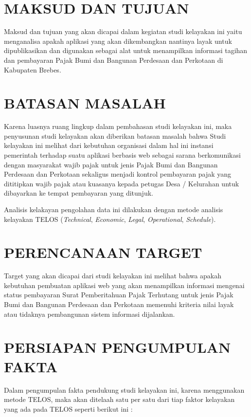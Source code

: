 \documentclass[pdftex,12pt, oneside]{article}
\begin{document}
\section{MAKSUD DAN TUJUAN}

Maksud dan tujuan yang akan dicapai dalam kegiatan studi kelayakan ini yaitu menganalisa apakah aplikasi yang akan dikembangkan nantinya layak untuk dipublikasikan dan digunakan sebagai alat untuk menampilkan informasi tagihan dan pembayaran Pajak Bumi dan Bangunan Perdesaan dan Perkotaan di Kabupaten Brebes.

\section{BATASAN MASALAH}

Karena luasnya ruang lingkup dalam pembahasan studi kelayakan ini, maka penyusunan studi kelayakan akan diberikan batasan masalah bahwa Studi kelayakan ini melihat dari kebutuhan organisasi dalam hal ini instansi pemerintah terhadap suatu aplikasi berbasis web sebagai sarana berkomunikasi dengan masyarakat wajib pajak untuk jenis Pajak Bumi dan Bangunan Perdesaan dan Perkotaan sekaligus menjadi kontrol pembayaran pajak yang dititipkan wajib pajak atau kuasanya kepada petugas Desa / Kelurahan untuk dibayarkan ke tempat pembayaran yang ditunjuk.

Analisis kelakayan pengolahan data ini dilakukan dengan metode analisis kelayakan TELOS (\textit{Technical}, \textit{Economic}, \textit{Legal}, \textit{Operational}, \textit{Schedule}).
  
\section{PERENCANAAN TARGET}

Target yang akan dicapai dari studi kelayakan ini melihat bahwa apakah kebutuhan pembuatan aplikasi web yang akan menampilkan informasi mengenai status pembayaran Surat Pemberitahuan Pajak Terhutang untuk jenis Pajak Bumi dan Bangunan Perdesaan dan Perkotaan memenuhi kriteria nilai layak atau tidaknya pembangunan sistem informasi dijalankan.

\section{PERSIAPAN PENGUMPULAN FAKTA}

Dalam pengumpulan fakta pendukung studi kelayakan ini, karena menggunakan metode TELOS, maka akan ditelaah satu per satu dari tiap faktor kelayakan yang ada pada TELOS seperti berikut ini :
\end{document}
